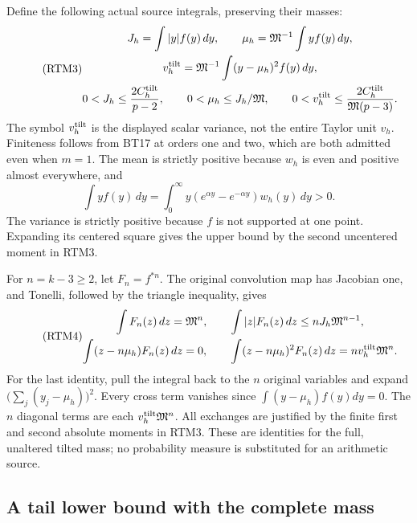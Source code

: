 Define the following actual source integrals, preserving their masses:
\begin{equation}\tag{RTM3}
 \begin{gathered}
 J_h=\int |y|f(y)\,dy,
 \qquad \mu_h=\mathfrak M^{-1}\int y f(y)\,dy,\\
 v_h^{\rm tilt}=\mathfrak M^{-1}
       \int(y-\mu_h)^2f(y)\,dy,\\
 0<J_h\le\frac{2C_h^{\rm tilt}}{p-2},\qquad
 0<\mu_h\le J_h/\mathfrak M,\qquad
 0<v_h^{\rm tilt}\le\frac{2C_h^{\rm tilt}}{\mathfrak M(p-3)}.
 \end{gathered}
\end{equation}
The symbol $v_h^{\rm tilt}$ is the displayed scalar variance, not the
entire Taylor unit $v_h$.  Finiteness follows from BT17 at orders one
and two, which are both admitted even when $m=1$.  The mean is strictly
positive because $w_h$ is even and positive almost everywhere, and
\[
 \int y f(y)\,dy=\int_0^\infty
 y(e^{\alpha y}-e^{-\alpha y})w_h(y)\,dy>0.
\]
The variance is strictly positive because $f$ is not supported at one
point.  Expanding its centered square gives the upper bound by the
second uncentered moment in RTM3.

For $n=k-3\ge2$, let $F_n=f^{*n}$.  The original convolution map has
Jacobian one, and Tonelli, followed by the triangle inequality, gives
\begin{equation}\tag{RTM4}
 \begin{gathered}
 \int F_n(z)\,dz=\mathfrak M^n,\qquad
 \int |z|F_n(z)\,dz\le nJ_h\mathfrak M^{n-1},\\
 \int (z-n\mu_h)F_n(z)\,dz=0,\qquad
 \int (z-n\mu_h)^2F_n(z)\,dz
       =nv_h^{\rm tilt}\mathfrak M^n.
 \end{gathered}
\end{equation}
For the last identity, pull the integral back to the $n$ original
variables and expand $\bigl(\sum_j(y_j-\mu_h)\bigr)^2$.
Every cross term vanishes since $\int(y-\mu_h)f(y)dy=0$.
The $n$ diagonal terms are each $v_h^{\rm tilt}\mathfrak M^n$.
All exchanges are justified by the finite first and second absolute
moments in RTM3.  These are identities for the full, unaltered tilted
mass; no probability measure is substituted for an arithmetic source.

\subsection{A tail lower bound with the complete mass}

